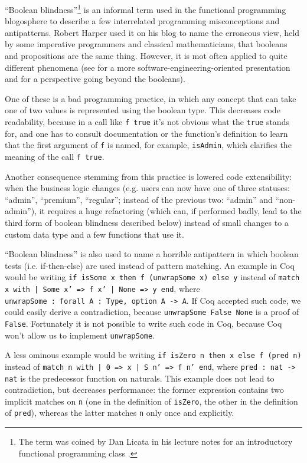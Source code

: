 \documentclass[declaration,mgr,english,shortabstract]{iithesis}
\newcommand{\m}[1]{\texttt{#1}}
\begin{document}
``Boolean blindness''\footnote{The term was coined by Dan Licata in his lecture notes for an introductory functional programming class \cite{BBLicata}.} is an informal term used in the functional programming blogosphere to describe a few interrelated programming misconceptions and antipatterns. Robert Harper used it on his blog \cite{BBHarper} to name the erroneous view, held by some imperative programmers and classical mathematicians, that booleans and propositions are the same thing. However, it is mot often applied to quite different phenomena (see \cite{BBFairbank} for a more software-engineering-oriented presentation and \cite{BBHXA} for a perspective going beyond the booleans).

One of these is a bad programming practice, in which any concept that can take one of two values is represented using the boolean type. This decreases code readability, because in a call like \m{f\ true} it's not obvious what the \m{true} stands for, and one has to consult documentation or the function's definition to learn that the first argument of \m{f} is named, for example, \m{isAdmin}, which clarifies the meaning of the call \m{f true}.

Another consequence stemming from this practice is lowered code extensibility: when the business logic changes (e.g. users can now have one of three statuses: ``admin'', ``premium'', ``regular''; instead of the previous two: ``admin'' and ``non-admin''), it requires a huge refactoring (which can, if performed badly, lead to the third form of boolean blindness described below) instead of small changes to a custom data type and a few functions that use it.

``Boolean blindness'' is also used to name a horrible antipattern in which boolean tests (i.e. if-then-else) are used instead of pattern matching. An example in Coq would be writing \m{if isSome x then f (unwrapSome x) else y} instead of \m{match x with | Some x' => f x' | None => y end}, where \m{unwrapSome\ :\ forall\ A\ :\ Type, option A -> A}. If Coq accepted such code, we could easily derive a contradiction, because \m{unwrapSome False None} is a proof of \m{False}. Fortunately it is not possible to write such code in Coq, because Coq won't allow us to implement \m{unwrapSome}.

A less ominous example would be writing \m{if isZero n then x else f (pred n)} instead of \m{match n with | 0 => x | S n' => f n' end}, where \m{pred\ :\ nat -> nat} is the predecessor function on naturals. This example does not lead to contradiction, but decreases performance: the former expression contains two implicit matches on \m{n} (one in the definition of \m{isZero}, the other in the definition of \m{pred}), whereas the latter matches \m{n} only once and explicitly.
\end{document}
